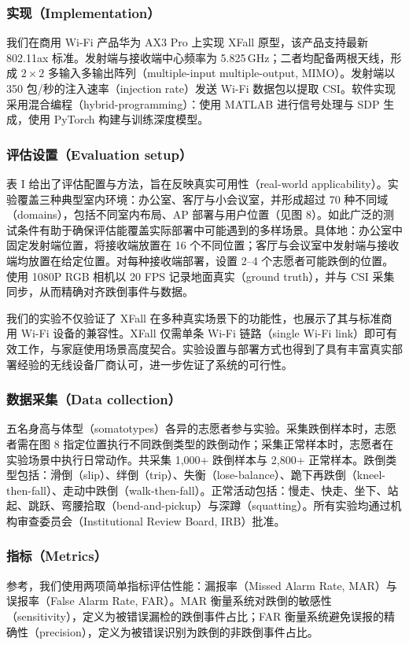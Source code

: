 \documentclass[UTF8,twocolumn]{ctexart}
\begin{document}
\subsubsection{实现（Implementation）}
我们在商用 Wi\!-\!Fi 产品华为 AX3 Pro 上实现 XFall 原型，该产品支持最新 802.11ax 标准。发射端与接收端中心频率为 5.825\,GHz；二者均配备两根天线，形成 $2\times 2$ 多输入多输出阵列（multiple-input multiple-output, MIMO）。发射端以 350 包/秒的注入速率（injection rate）发送 Wi\!-\!Fi 数据包以提取 CSI。软件实现采用混合编程（hybrid-programming）：使用 MATLAB 进行信号处理与 SDP 生成，使用 PyTorch 构建与训练深度模型。

\subsubsection{评估设置（Evaluation setup）}
表 I 给出了评估配置与方法，旨在反映真实可用性（real-world applicability）。实验覆盖三种典型室内环境：办公室、客厅与小会议室，并形成超过 70 种不同域（domains），包括不同室内布局、AP 部署与用户位置（见图 8）。如此广泛的测试条件有助于确保评估能覆盖实际部署中可能遇到的多样场景。具体地：办公室中固定发射端位置，将接收端放置在 16 个不同位置；客厅与会议室中发射端与接收端均放置在给定位置。对每种接收端部署，设置 2--4 个志愿者可能跌倒的位置。使用 1080P RGB 相机以 20 FPS 记录地面真实（ground truth），并与 CSI 采集同步，从而精确对齐跌倒事件与数据。

我们的实验不仅验证了 XFall 在多种真实场景下的功能性，也展示了其与标准商用 Wi\!-\!Fi 设备的兼容性。XFall 仅需单条 Wi\!-\!Fi 链路（single Wi-Fi link）即可有效工作，与家庭使用场景高度契合。实验设置与部署方式也得到了具有丰富真实部署经验的无线设备厂商认可，进一步佐证了系统的可行性。

\subsubsection{数据采集（Data collection）}
五名身高与体型（somatotypes）各异的志愿者参与实验。采集跌倒样本时，志愿者需在图 8 指定位置执行不同跌倒类型的跌倒动作；采集正常样本时，志愿者在实验场景中执行日常动作。共采集 1,000+ 跌倒样本与 2,800+ 正常样本。跌倒类型包括：滑倒（slip）、绊倒（trip）、失衡（lose-balance）、跪下再跌倒（kneel-then-fall）、走动中跌倒（walk-then-fall）。正常活动包括：慢走、快走、坐下、站起、跳跃、弯腰拾取（bend-and-pickup）与深蹲（squatting）。所有实验均通过机构审查委员会（Institutional Review Board, IRB）批准。

\subsubsection{指标（Metrics）}
参考\cite{ref15}，我们使用两项简单指标评估性能：漏报率（Missed Alarm Rate, MAR）与误报率（False Alarm Rate, FAR）。MAR 衡量系统对跌倒的敏感性（sensitivity），定义为被错误漏检的跌倒事件占比；FAR 衡量系统避免误报的精确性（precision），定义为被错误识别为跌倒的非跌倒事件占比。
\end{document}
